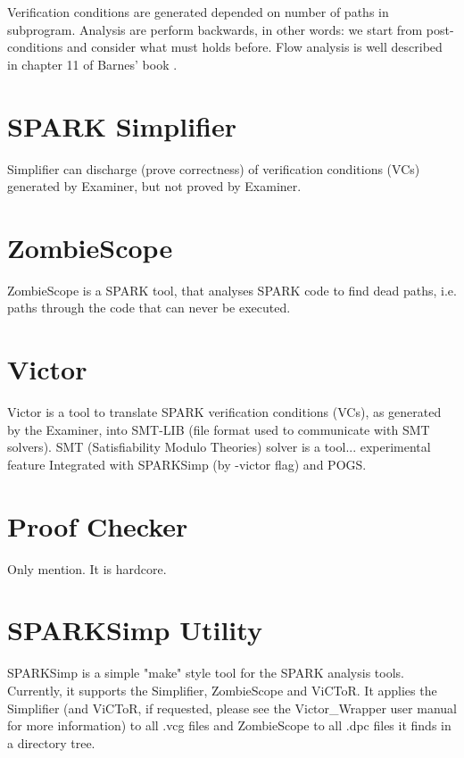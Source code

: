 Verification conditions are generated depended on number of paths in subprogram. Analysis are perform backwards, in other words: we start from post-conditions and consider what must holds before. Flow analysis is well described in chapter 11 of Barnes' book \cite{Barnes:Book}.



\section{SPARK Simplifier}
\label{verification:simplifier}

Simplifier can discharge (prove correctness) of verification conditions (VCs) generated by Examiner, but not proved by Examiner. \cite{Simplifier:Online} 



\section{ZombieScope}
\label{verification:zombiescope}

ZombieScope is a SPARK tool, that analyses SPARK code to find dead paths, i.e. paths through the code that can never be executed.


\section{Victor}
\label{verification:victor}

Victor is a tool to translate SPARK verification conditions (VCs), as generated by the Examiner, into SMT-LIB (file format used to communicate with SMT solvers). \cite{Victor:Online} SMT (Satisfiability Modulo Theories) solver is a tool...
experimental feature
Integrated with SPARKSimp (by -victor flag) and POGS.


\section{Proof Checker}
\label{verification:proofchecker}

Only mention. It is hardcore.

\section{SPARKSimp Utility}
\label{verification:sparksimp}
SPARKSimp is a simple "make" style tool for the SPARK analysis tools. Currently, it supports the Simplifier, ZombieScope and ViCToR. It applies the Simplifier (and ViCToR, if requested, please see the Victor\_Wrapper user manual \cite{Victor:Online} for more information) to all .vcg files and ZombieScope to all .dpc files it finds in a directory tree. \cite{SPARKSimp:Online} 



